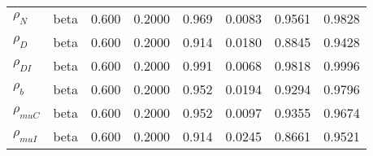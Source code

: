 \begin{center}
\begin{longtable}{llcccccc}
${\rho_N}$ & beta &   0.600 & 0.2000 &   0.969& 0.0083 &  0.9561 &  0.9828 \\ 
${\rho_D}$ & beta &   0.600 & 0.2000 &   0.914& 0.0180 &  0.8845 &  0.9428 \\ 
${\rho_{DI}}$ & beta &   0.600 & 0.2000 &   0.991& 0.0068 &  0.9818 &  0.9996 \\ 
${\rho_b}$ & beta &   0.600 & 0.2000 &   0.952& 0.0194 &  0.9294 &  0.9796 \\ 
${\rho_{muC}}$ & beta &   0.600 & 0.2000 &   0.952& 0.0097 &  0.9355 &  0.9674 \\ 
${\rho_{muI}}$ & beta &   0.600 & 0.2000 &   0.914& 0.0245 &  0.8661 &  0.9521 \\ 
\end{longtable}
 \end{center}
